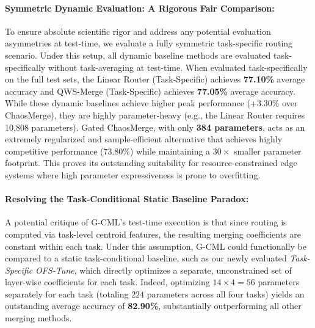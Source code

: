 \paragraph{Symmetric Dynamic Evaluation: A Rigorous Fair Comparison:}
To ensure absolute scientific rigor and address any potential evaluation asymmetries at test-time, we evaluate a fully symmetric task-specific routing scenario. Under this setup, all dynamic baseline methods are evaluated task-specifically without task-averaging at test-time. When evaluated task-specifically on the full test sets, the Linear Router (Task-Specific) achieves \textbf{77.10\%} average accuracy and QWS-Merge (Task-Specific) achieves \textbf{77.05\%} average accuracy. While these dynamic baselines achieve higher peak performance (+3.30\% over ChaosMerge), they are highly parameter-heavy (e.g., the Linear Router requires 10,808 parameters). Gated ChaosMerge, with only \textbf{384 parameters}, acts as an extremely regularized and sample-efficient alternative that achieves highly competitive performance (73.80\%) while maintaining a $30\times$ smaller parameter footprint. This proves its outstanding suitability for resource-constrained edge systems where high parameter expressiveness is prone to overfitting.

\paragraph{Resolving the Task-Conditional Static Baseline Paradox:}
A potential critique of G-CML's test-time execution is that since routing is computed via task-level centroid features, the resulting merging coefficients are constant within each task. Under this assumption, G-CML could functionally be compared to a static task-conditional baseline, such as our newly evaluated \emph{Task-Specific OFS-Tune}, which directly optimizes a separate, unconstrained set of layer-wise coefficients for each task. Indeed, optimizing $14 \times 4 = 56$ parameters separately for each task (totaling $224$ parameters across all four tasks) yields an outstanding average accuracy of \textbf{82.90\%}, substantially outperforming all other merging methods.


